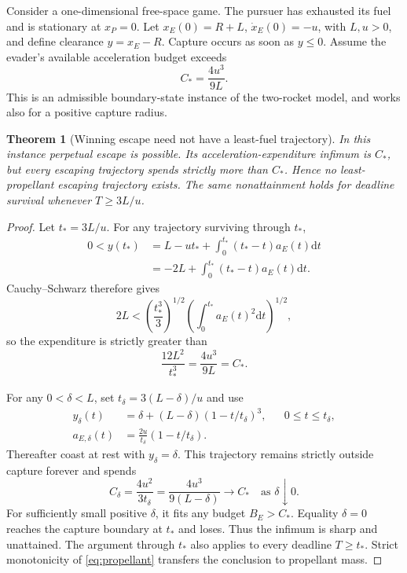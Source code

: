 \documentclass[journal,a4paper]{IEEEtran}
\newtheorem{theorem}{Theorem}
\newcommand{\dd}{\mathrm d}
\begin{document}
Consider a one-dimensional free-space game. The pursuer has exhausted its fuel and is stationary at $x_P=0$. Let $x_E(0)=R+L$, $\dot x_E(0)=-u$, with $L,u>0$, and define clearance $y=x_E-R$. Capture occurs as soon as $y\le0$. Assume the evader's available acceleration budget exceeds
\begin{equation}
 C_* =\frac{4u^3}{9L}.
 \label{eq:Cstar}
\end{equation}
This is an admissible boundary-state instance of the two-rocket model, and works also for a positive capture radius.

\begin{theorem}[Winning escape need not have a least-fuel trajectory]
\label{thm:nonattain}
In this instance perpetual escape is possible. Its acceleration-expenditure infimum is $C_*$, but every escaping trajectory spends strictly more than $C_*$. Hence no least-propellant escaping trajectory exists. The same nonattainment holds for deadline survival whenever $T\ge3L/u$.
\end{theorem}
\begin{proof}
Let $t_*=3L/u$. For any trajectory surviving through $t_*$,
\begin{align}
 0<y(t_*)&=L-ut_*+\int_0^{t_*}(t_*-t)a_E(t)\dd t\\
 &=-2L+\int_0^{t_*}(t_*-t)a_E(t)\dd t.\nonumber
\end{align}
Cauchy--Schwarz therefore gives
\begin{equation}
 2L<\left(\frac{t_*^3}{3}\right)^{1/2}
          \left(\int_0^{t_*}a_E(t)^2\dd t\right)^{1/2},
\end{equation}
so the expenditure is strictly greater than
\begin{equation}
 \frac{12L^2}{t_*^3}=\frac{4u^3}{9L}=C_*.
\end{equation}

For any $0<\delta<L$, set $t_\delta=3(L-\delta)/u$ and use
\begin{align}
 y_\delta(t)&=\delta+(L-\delta)(1-t/t_\delta)^3,
                                      &&0\le t\le t_\delta,\label{eq:escapeprofile}\\
 a_{E,\delta}(t)&=\frac{2u}{t_\delta}(1-t/t_\delta).
\end{align}
Thereafter coast at rest with $y_\delta=\delta$. This trajectory remains strictly outside capture forever and spends
\begin{equation}
 C_\delta=\frac{4u^2}{3t_\delta}
         =\frac{4u^3}{9(L-\delta)}\longrightarrow C_*
         \quad\text{as }\delta\downarrow0.
\end{equation}
For sufficiently small positive $\delta$, it fits any budget $B_E>C_*$. Equality $\delta=0$ reaches the capture boundary at $t_*$ and loses. Thus the infimum is sharp and unattained. The argument through $t_*$ also applies to every deadline $T\ge t_*$. Strict monotonicity of \eqref{eq:propellant} transfers the conclusion to propellant mass.
\end{proof}
\end{document}
